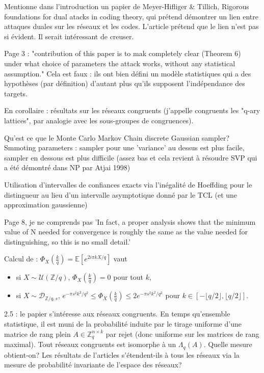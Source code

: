 \documentclass{article}
\begin{document}
Mentionne dans l'introduction un papier de Meyer-Hifliger \& Tillich, Rigorous foundations for dual atacks in coding theory, qui prétend démontrer un lien entre attaques duales sur les réseaux et les codes. L'article prétend que le lien n'est pas si évident. Il serait intéressant de creuser.

Page 3 : "contribution of this paper is to mak completely clear (Theorem 6) under what choice of parameters the attack works, without any statistical assumption." Cela est faux : ils ont bien défini un modèle statistiques qui a des hypothèses (par définition) d'autant plus qu'ils supposent l'indépendance des targets.

En corollaire : résultats sur les réseaux congruents (j'appelle congruents les "q-ary lattices", par analogie avec les sous-groupes de congruences).

Qu'est ce que le Monte Carlo Markov Chain discrete Gaussian sampler? Smmoting parameters : sampler pour une 'variance' au dessus est plus facile, sampler en dessous est plus difficile (assez bas et cela revient à résoudre SVP qui a été démontré dans NP par Atjai 1998)

Utilisation d'intervalles de confiances exacts via l'inégalité de Hoeffding pour le distingueur au lieu d'un intervalle asymptotique donné par le TCL (et une approximation gaussienne)

Page 8, je ne comprends pas 'In fact, a proper analysis shows that the minimum value of N needed for convergence is roughly the same as the value needed for distinguishing, so this is no small detail.'

Calcul de \cite{19} : $\Phi_X(\frac{k}{q}) = \mathbb E[e^{2i\pi k X/q}] $ vaut
\begin{itemize}
\item si $X\sim \mathcal U(\mathbb Z/q)$, $\Phi_X(\frac{k}{q})  = 0$ pour tout $k$,
\item si $X\sim \mathcal D_{\mathbb Z/q , s}$, $ e^{-\pi s^2k^2 / q^2} \leq \Phi_X(\frac{k}{q})  \leq 2e^{-\pi s^2k^2 / q^2}$ pour $k\in [-\lfloor q/2\rfloor , \lfloor q/2\rfloor ]$.
\end{itemize}

2.5 : le papier s'intéresse aux réseaux congruents. En temps qu'ensemble statistique, il est muni de la probabilité induite par le tirage uniforme d'une matrice de rang plein $A\in \mathbb Z_q^{n\times k}$ par rejet (donc uniforme sur les matrices de rang maximal). Tout réseaux congruents est isomorphe à un $\Lambda_q(A)$. Quelle mesure obtient-on? Les résultats de l'articles s'étendent-ils à tous les réseaux via la mesure de probabilité invariante de l'espace des réseaux?  
\end{document}
